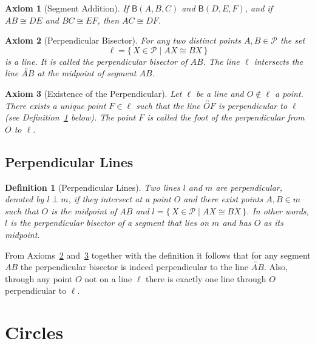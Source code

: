 \documentclass[12pt]{article}
\newtheorem{axiom}{Axiom}[section]
\newtheorem{definition}{Definition}[section]
\newcommand{\rel}[1]{\mathsf{B}(#1)}
\newcommand{\congsegment}{\cong}
\begin{document}
\begin{axiom}[Segment Addition]\label{ax:add}
If $\rel{A,B,C}$ and $\rel{D,E,F}$, and if $AB\congsegment DE$ and $BC\congsegment EF$, then $AC\congsegment DF$.
\end{axiom}

\begin{axiom}[Perpendicular Bisector]\label{ax:perpbis}
For any two distinct points $A,B\in\mathcal{P}$ the set
\[
\ell = \{\,X\in\mathcal{P}\mid AX\congsegment BX\,\}
\]
is a line. It is called the \emph{perpendicular bisector} of $AB$. The line $\ell$ intersects the line $\overleftrightarrow{AB}$ at the midpoint of segment $AB$.
\end{axiom}

\begin{axiom}[Existence of the Perpendicular]\label{ax:perp}
Let $\ell$ be a line and $O\notin\ell$ a point. There exists a unique point $F\in\ell$ such that the line $\overleftrightarrow{OF}$ is perpendicular to $\ell$ (see Definition~\ref{def:perp} below). The point $F$ is called the \emph{foot} of the perpendicular from $O$ to $\ell$.
\end{axiom}

\subsection{Perpendicular Lines}

\begin{definition}[Perpendicular Lines]\label{def:perp}
Two lines $l$ and $m$ are \emph{perpendicular}, denoted by $l\perp m$, if they intersect at a point $O$ and there exist points $A,B\in m$ such that $O$ is the midpoint of $AB$ and $l = \{\,X\in\mathcal{P}\mid AX\congsegment BX\,\}$. In other words, $l$ is the perpendicular bisector of a segment that lies on $m$ and has $O$ as its midpoint.
\end{definition}

From Axioms~\ref{ax:perpbis} and~\ref{ax:perp} together with the definition it follows that for any segment $AB$ the perpendicular bisector is indeed perpendicular to the line $\overleftrightarrow{AB}$. Also, through any point $O$ not on a line $\ell$ there is exactly one line through $O$ perpendicular to $\ell$.

\section{Circles}
\end{document}
